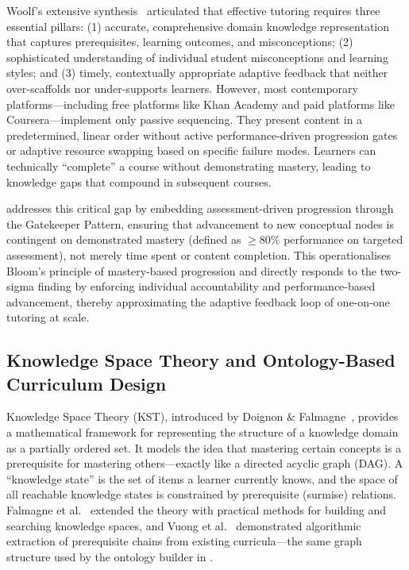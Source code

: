 Woolf's extensive synthesis~\cite{woolf2009} articulated that effective tutoring requires three essential pillars: (1) accurate, comprehensive domain knowledge representation that captures prerequisites, learning outcomes, and misconceptions; (2) sophisticated understanding of individual student misconceptions and learning styles; and (3) timely, contextually appropriate adaptive feedback that neither over-scaffolds nor under-supports learners. However, most contemporary platforms---including free platforms like Khan Academy and paid platforms like Coursera---implement only passive sequencing. They present content in a predetermined, linear order without active performance-driven progression gates or adaptive resource swapping based on specific failure modes. Learners can technically \enquote{complete} a course without demonstrating mastery, leading to knowledge gaps that compound in subsequent courses.

\projectname{} addresses this critical gap by embedding assessment-driven progression through the Gatekeeper Pattern, ensuring that advancement to new conceptual nodes is contingent on demonstrated mastery (defined as \(\ge 80\%\) performance on targeted assessment), not merely time spent or content completion. This operationalises Bloom's principle of mastery-based progression and directly responds to the two-sigma finding by enforcing individual accountability and performance-based advancement, thereby approximating the adaptive feedback loop of one-on-one tutoring at scale.

\subsection{Knowledge Space Theory and Ontology-Based Curriculum Design}
\label{sec:kst-ontology}

Knowledge Space Theory (KST), introduced by Doignon \& Falmagne~\cite{doignon1985}, provides a mathematical framework for representing the structure of a knowledge domain as a partially ordered set. It models the idea that mastering certain concepts is a prerequisite for mastering others---exactly like a directed acyclic graph (DAG). A \enquote{knowledge state} is the set of items a learner currently knows, and the space of all reachable knowledge states is constrained by prerequisite (surmise) relations. Falmagne et al.~\cite{falmagne1990} extended the theory with practical methods for building and searching knowledge spaces, and Vuong et al.~\cite{vuong2011} demonstrated algorithmic extraction of prerequisite chains from existing curricula---the same graph structure used by the ontology builder in \projectname.

